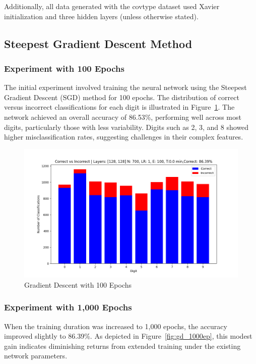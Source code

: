 \documentclass{article}
\begin{document}
Additionally, all data generated with the covtype dataset used Xavier initialization and three hidden layers (unless otherwise stated).

\subsection{Steepest Gradient Descent Method}

\subsubsection{Experiment with 100 Epochs}
The initial experiment involved training the neural network using the Steepest Gradient Descent (SGD) method for 100 epochs. The distribution of correct versus incorrect classifications for each digit is illustrated in Figure~\ref{fig:gd_100ep}. The network achieved an overall accuracy of 86.53\%, performing well across most digits, particularly those with less variability. Digits such as 2, 3, and 8 showed higher misclassification rates, suggesting challenges in their complex features.

\begin{figure}[h!]
    \centering
    \includegraphics[scale=0.5]{../figs/gd_100ep.png}
    \caption{Gradient Descent with 100 Epochs}
    \label{fig:gd_100ep}
\end{figure}

\subsubsection{Experiment with 1,000 Epochs}
When the training duration was increased to 1,000 epochs, the accuracy improved slightly to 86.39\%. As depicted in Figure~\ref{fig:gd_1000ep}, this modest gain indicates diminishing returns from extended training under the existing network parameters.
\end{document}
